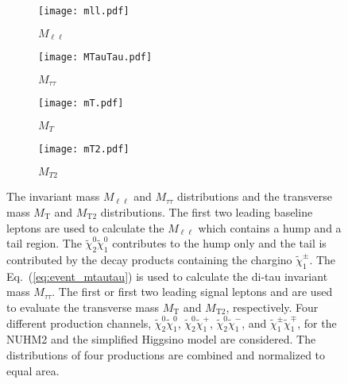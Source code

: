 \begin{figure}[htbp]
    \begin{center}
        \begin{subfigure}[b]{0.48\textwidth}
            \texttt{[image: mll.pdf]}
            \caption{$M_{\ell\ell}$}
        \end{subfigure}
        \begin{subfigure}[b]{0.48\textwidth}
            \texttt{[image: MTauTau.pdf]}
            \caption{$M_{\tau\tau}$}
        \end{subfigure}
        \begin{subfigure}[b]{0.48\textwidth}
            \texttt{[image: mT.pdf]}
            \caption{$M_{T}$}
        \end{subfigure}
        \begin{subfigure}[b]{0.48\textwidth}
            \texttt{[image: mT2.pdf]}
            \caption{$M_{T2}$}
        \end{subfigure}
    \end{center}
    \caption{The invariant mass $M_{\ell\ell}$ and $M_{\tau\tau}$ distributions and the transverse mass $M_\mathrm{T}$ and $M_\mathrm{T2}$ distributions.
    The first two leading baseline leptons are used to calculate the $M_{\ell\ell}$ which contains a hump and a tail region.
    The $\widetilde{\chi}^{0}_{2} \widetilde{\chi}^{0}_{1}$ contributes to the hump only and the tail is contributed by the decay products containing the chargino $\widetilde{\chi}^{\pm}_{1}$.
    The Eq.~(\ref{eq:event_mtautau}) is used to calculate the di-tau invariant mass $M_{\tau\tau}$.
    The first or first two leading signal leptons and \met are used to evaluate the transverse mass $M_\mathrm{T}$ and $M_\mathrm{T2}$, respectively.
    Four different production channels, $\widetilde{\chi}^{0}_{2}\widetilde{\chi}^{0}_{1}$, $\widetilde{\chi}^{0}_{2}\widetilde{\chi}^{+}_{1}$, $\widetilde{\chi}^{0}_{2}\widetilde{\chi}^{-}_{1}$, and $\widetilde{\chi}^{\pm}_{1}\widetilde{\chi}^{\mp}_{1}$, for the NUHM2 and the simplified Higgsino model are considered.
    The distributions of four productions are combined and normalized to equal area.}
    \label{fig:results_nuhm2_mll_mtautau_mT_mT2}
\end{figure}

